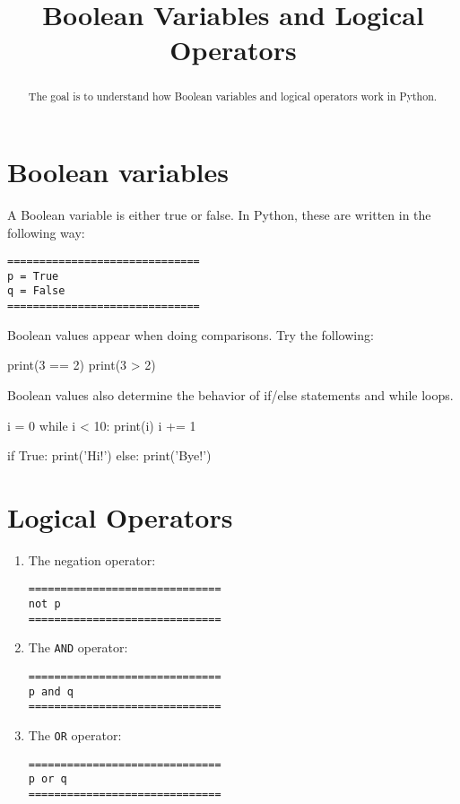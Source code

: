 \documentclass{ximera}
\title{Boolean Variables and Logical Operators}
\begin{document}
\begin{abstract}
The goal is to understand how Boolean variables and logical operators work in Python.
\end{abstract}
\maketitle

\section{Boolean variables}

A Boolean variable is either true or false. In Python, these are written in the following way:

\begin{verbatim}
==============================
p = True
q = False
==============================
\end{verbatim}

Boolean values appear when doing comparisons. Try the following:

\begin{sageCell}
print(3 == 2)
print(3 > 2)
\end{sageCell}

Boolean values also determine the behavior of if/else statements and while loops.
\begin{sageCell}
i = 0
while i < 10:
        print(i)
        i += 1
\end{sageCell}

\begin{sageCell}
if True:
        print('Hi!')
else:
        print('Bye!')
\end{sageCell}
    
\section{Logical Operators}

\begin{enumerate}
    \item The negation operator:
\begin{verbatim}
==============================
not p
==============================
\end{verbatim}

    \item The \verb|AND| operator:
\begin{verbatim}
==============================
p and q
==============================
\end{verbatim}

    \item The \verb|OR| operator:
\begin{verbatim}
==============================
p or q
==============================
\end{verbatim}
\end{enumerate}
\end{document}
